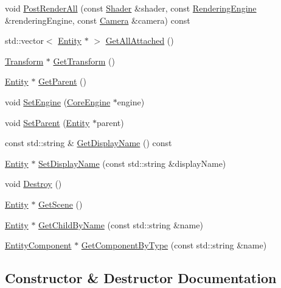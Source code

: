 \begin{DoxyCompactItemize}
void \hyperlink{class_entity_a01754307786d6d6891ccec895d7c26fa}{Post\+Render\+All} (const \hyperlink{class_shader}{Shader} \&shader, const \hyperlink{class_rendering_engine}{Rendering\+Engine} \&rendering\+Engine, const \hyperlink{class_camera}{Camera} \&camera) const 
\item 
std\+::vector$<$ \hyperlink{class_entity}{Entity} $\ast$ $>$ \hyperlink{class_entity_a77b7d12e1014fa2a128c8e3aa6d39ea3}{Get\+All\+Attached} ()
\item 
\hyperlink{class_transform}{Transform} $\ast$ \hyperlink{class_entity_a5ea21fddf63008658e00854465480034}{Get\+Transform} ()
\item 
\hyperlink{class_entity}{Entity} $\ast$ \hyperlink{class_entity_a5276811e6b06f2cdadcab05c2101ab00}{Get\+Parent} ()
\item 
void \hyperlink{class_entity_ae57c283bdba04e4d806115ff96931e94}{Set\+Engine} (\hyperlink{class_core_engine}{Core\+Engine} $\ast$engine)
\item 
void \hyperlink{class_entity_a9868d4eec27cce13c9c70d8682f82dcd}{Set\+Parent} (\hyperlink{class_entity}{Entity} $\ast$parent)
\item 
const std\+::string \& \hyperlink{class_entity_a332f7c70751b38fd8613b869769bfc9f}{Get\+Display\+Name} () const 
\item 
\hyperlink{class_entity}{Entity} $\ast$ \hyperlink{class_entity_a82d3a29a088de0e03ca7efec31616b44}{Set\+Display\+Name} (const std\+::string \&display\+Name)
\item 
void \hyperlink{class_entity_aa75151fc607686b42d27f8c3ba73143d}{Destroy} ()
\item 
\hyperlink{class_entity}{Entity} $\ast$ \hyperlink{class_entity_ab09ef7808570f70f07e18cbc1d231d39}{Get\+Scene} ()
\item 
\hyperlink{class_entity}{Entity} $\ast$ \hyperlink{class_entity_aa70bc19f38ec105785d27df0134284fb}{Get\+Child\+By\+Name} (const std\+::string \&name)
\item 
\hyperlink{class_entity_component}{Entity\+Component} $\ast$ \hyperlink{class_entity_a1e23b43bf0b76ba6ef427154eb8eea9e}{Get\+Component\+By\+Type} (const std\+::string \&name)
\end{DoxyCompactItemize}


\subsection{Constructor \& Destructor Documentation}
\hypertarget{class_entity_a0ff4aa25e3f7d68cee620ee473d0801c}{}
